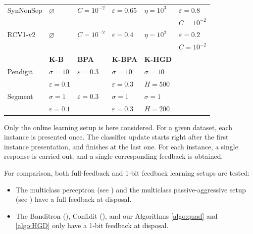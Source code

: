 \documentclass[preprint,12pt,authoryear]{elsarticle}
\begin{document}
\begin{table}[h]
\begin{center}
\begin{tabular}{llllll}
			SynNonSep & $\varnothing$ & $C=10^{-2}$ & $\varepsilon =0.65$ & $\eta = 10^3$& $\varepsilon = 0.8$\\
			&&&&& $C = 10^{-2}$\\			
			RCV1-v2 & $\varnothing$ & $C=10^{-2}$ & $\varepsilon =0.4$ & $\eta = 10^2$ & $\varepsilon = 0.2$\\
			&&&&& $C = 10^{-2}$\\
			\hline
			&{\bf K-B} & {\bf BPA} & {\bf K-BPA} &{\bf K-HGD}\\
			\hline
			Pendigit & $\sigma = 10$ & $\varepsilon = 0.3$ &$\sigma = 10$&$\sigma = 10$\\
			&$\varepsilon =0.1$&& $\varepsilon = 0.3$ & $H = 500$\\
			Segment & $\sigma = 1$ & $\varepsilon = 0.3$ & $\sigma = 1$ &$\sigma = 1$\\
			&$\varepsilon =0.1$&&$\varepsilon = 0.3$ & $H = 200$\\
			
		\end{tabular}	
	\end{center}
\end{table}


Only the online learning setup is here considered. For a given dataset, each instance is presented once. The classifier update starts right after the first instance presentation, and finishes at the last one. For each instance, a single response is carried out, and a single corresponding feedback is obtained.

For comparison, both full-feedback and 1-bit feedback learning setups are tested:
\begin{itemize}
	\item The multiclass perceptron (see \cite{duda1973pattern}) and the multiclass passive-aggressive setup (see  \cite{crammer2006online}) have a full feedback at disposal.
	\item The Banditron (\cite{kakade2008efficient}), Confidit (\cite{crammer2013multiclass}), and our Algorithms \ref{algo:quad} and  \ref{algo:HGD} only have a 1-bit feedback at disposal.
\end{itemize} 



\end{document}
